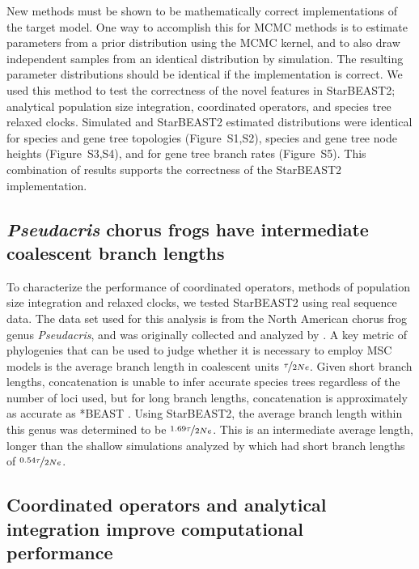 \documentclass[12pt]{article}
\begin{document}
New methods must be shown to be mathematically correct implementations of the
target model. One way to accomplish this for MCMC methods is to estimate
parameters from a prior distribution using the MCMC kernel, and to also draw
independent samples from an identical distribution by simulation. The resulting
parameter distributions should be identical if the implementation is correct. We
used this method to test the correctness of the novel features in StarBEAST2;
analytical population size integration, coordinated operators, and species tree
relaxed clocks. Simulated and StarBEAST2 estimated distributions were identical
for species and gene tree topologies (Figure~S1,S2), species and gene tree node
heights (Figure~S3,S4), and for gene tree branch rates (Figure~S5). This
combination of results supports the correctness of the StarBEAST2
implementation.

\subsection*{\textit{Pseudacris} chorus frogs have intermediate coalescent branch lengths}

To characterize the performance of coordinated operators, methods of population size
integration and relaxed clocks, we tested StarBEAST2 using real sequence data.
The data set used for this analysis is from the North American chorus frog genus
\textit{Pseudacris}, and was originally collected and analyzed by
\cite{Barrow201478}. A key metric of phylogenies that can be used to judge
whether it is necessary to employ MSC models is the average
branch length in coalescent units $\nicefrac{\tau}{2Ne}$. Given short branch
lengths, concatenation is unable to infer accurate species trees regardless of
the number of loci used, but for long branch lengths, concatenation is
approximately as accurate as *BEAST \citep{Ogilvie01052016}. Using StarBEAST2,
the average branch length within this genus was determined to be
$\nicefrac{1.69\tau}{2Ne}$. This is an intermediate average length, longer than
the shallow simulations analyzed by \cite{Ogilvie01052016} which had short
branch lengths of $\nicefrac{0.54\tau}{2Ne}$.

\subsection*{Coordinated operators and analytical integration improve computational performance}
\end{document}
